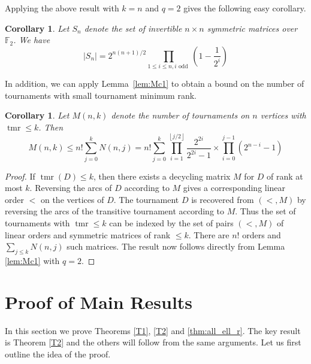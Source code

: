 \documentclass[10pt,a4paper]{amsart}
\numberwithin{equation}{section}
\theoremstyle{plain}
\newtheorem{cor}[thm]{Corollary}
\theoremstyle{remark}
\theoremstyle{definition}
\newcommand{\lb}{\left(}
\newcommand{\rb}{\right)}
\newcommand{\tmr}{\operatorname{tmr}}
\begin{document}
Applying the above result with $k =n$ and $q=2$ gives the following easy corollary.
 \begin{cor}  \label{lem:Mc2}
     Let $S_n$ denote the set of invertible $n\times n$ symmetric matrices over $\mathbb{F}_2$. We have
     \begin{equation*}
         |S_n| = 2^{n(n+1)/2} \prod_{1 \leq i \le n, i \text{ odd  }} \lb1-\frac{1}{2^i}\rb
     \end{equation*}
 \end{cor}

 
In addition, we can apply Lemma~\ref{lem:Mc1} to obtain a bound on the number of tournaments with small tournament minimum rank.
 \begin{cor} \label{lem:count}
     Let $M(n,k)$ denote the number of tournaments on $n$ vertices with ${\tmr \leq k}$. Then 
     \begin{equation*}
         M(n,k) \leq n! \sum_{j=0}^k N(n,j) = n!  \sum_{j=0}^k \prod_{i=1}^{\left \lfloor{j/2}\right \rfloor } \frac{2^{2i}}{2^{2i}-1} \times \prod_{i=0}^{j-1} (2^{n-i}-1)
     \end{equation*}
 \end{cor}

 \begin{proof}
     If $\tmr(D) \leq k$, then there exists a decycling matrix $M$ for $D$ of rank at most $k$. Reversing the arcs of $D$ according to $M$ gives a corresponding  linear order $<$ on the vertices of $D$. The tournament $D$ is recovered from $(<,M)$ by reversing the arcs of the transitive tournament according to $M$. Thus the set of tournaments with $\tmr \leq k$ can be indexed by the set of pairs $(<,M)$ of linear orders and symmetric matrices of rank $ \leq k$. There are $n!$ orders and $\sum_{j \leq k} N(n,j)$ such matrices. The result now follows directly from Lemma \ref{lem:Mc1} with $q = 2$.
 \end{proof}

 
\section{Proof of Main Results}\label{sec:main}

In this section we prove Theorems \ref{T1}, \ref{T2} and \ref{thm:all_ell_r}. The key result is Theorem  \ref{T2} and the others will follow from the same arguments. Let us first outline the idea of the proof.
\end{document}
